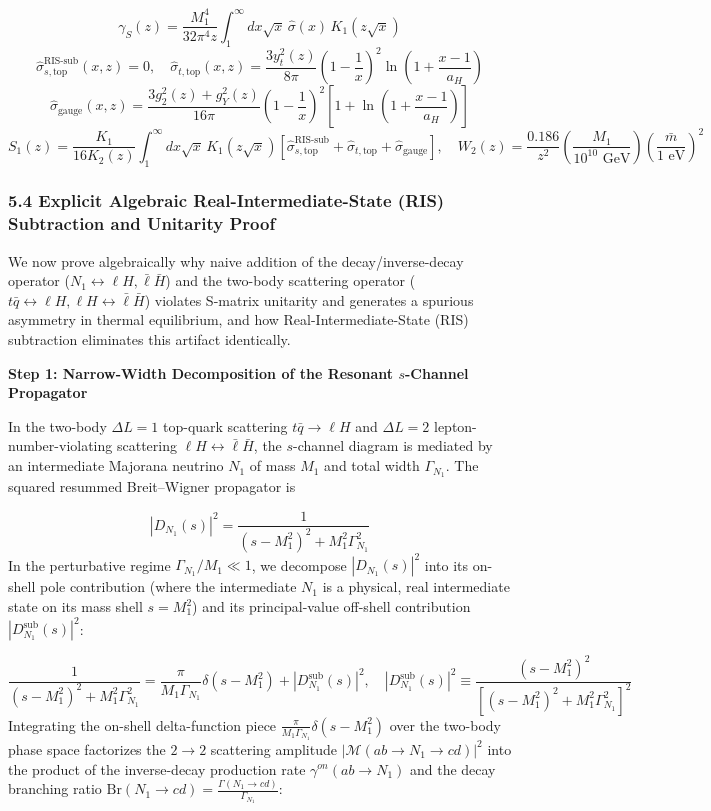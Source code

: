 \documentclass[aps,prd,onecolumn,superscriptaddress,nofootinbib,longbibliography,10pt]{revtex4-2}
\begin{document}
  \[ \gamma_S(z) = \frac{M_1^4}{32\pi^4 z}\int_1^\infty dx\sqrt{x}\,\hat{\sigma}(x)\,K_1\left(z\sqrt{x}\right) \]
  \[ \hat{\sigma}_{s,\text{top}}^{\text{RIS-sub}}(x,z) = 0, \quad \hat{\sigma}_{t,\text{top}}(x,z) = \frac{3y_t^2(z)}{8\pi}\left(1 - \frac{1}{x}\right)^2\ln\left(1 + \frac{x - 1}{a_H}\right) \]
  \[ \hat{\sigma}_{\text{gauge}}(x,z) = \frac{3g_2^2(z) + g_Y^2(z)}{16\pi}\left(1 - \frac{1}{x}\right)^2\left[ 1 + \ln\left(1 + \frac{x - 1}{a_H}\right) \right] \]
  \[ S_1(z) = \frac{K_1}{16K_2(z)}\int_1^\infty dx\sqrt{x}\,K_1(z\sqrt{x})\left[ \hat{\sigma}_{s,\text{top}}^{\text{RIS-sub}} + \hat{\sigma}_{t,\text{top}} + \hat{\sigma}_{\text{gauge}} \right], \quad W_2(z) = \frac{0.186}{z^2}\left(\frac{M_1}{10^{10}\text{ GeV}}\right)\left(\frac{\bar{m}}{1\text{ eV}}\right)^2 \]
  
  
\subsubsection*{5.4 Explicit Algebraic Real-Intermediate-State (RIS) Subtraction and Unitarity Proof}

  We now prove algebraically why naive addition of the decay/inverse-decay operator (\(N_1 \leftrightarrow \ell H, \bar{\ell}\bar{H}\)) and the two-body scattering operator (\(t\bar{q} \leftrightarrow \ell H, \ell H \leftrightarrow \bar{\ell}\bar{H}\)) violates S-matrix unitarity and generates a spurious asymmetry in thermal equilibrium, and how Real-Intermediate-State (RIS) subtraction eliminates this artifact identically.


  \textbf{Step 1: Narrow-Width Decomposition of the Resonant \(s\)-Channel Propagator}


  In the two-body \(\Delta L = 1\) top-quark scattering \(t\bar{q} \to \ell H\) and \(\Delta L = 2\) lepton-number-violating scattering \(\ell H \leftrightarrow \bar{\ell}\bar{H}\), the \(s\)-channel diagram is mediated by an intermediate Majorana neutrino \(N_1\) of mass \(M_1\) and total width \(\Gamma_{N_1}\). The squared resummed Breit–Wigner propagator is


  \[ |D_{N_1}(s)|^2 = \frac{1}{(s - M_1^2)^2 + M_1^2\Gamma_{N_1}^2} \]
  In the perturbative regime \(\Gamma_{N_1}/M_1 \ll 1\), we decompose \(|D_{N_1}(s)|^2\) into its on-shell pole contribution (where the intermediate \(N_1\) is a physical, real intermediate state on its mass shell \(s = M_1^2\)) and its principal-value off-shell contribution \(|D_{N_1}^{\text{sub}}(s)|^2\):


  \[ \frac{1}{(s - M_1^2)^2 + M_1^2\Gamma_{N_1}^2} = \frac{\pi}{M_1\Gamma_{N_1}}\delta(s - M_1^2) + |D_{N_1}^{\text{sub}}(s)|^2, \quad |D_{N_1}^{\text{sub}}(s)|^2 \equiv \frac{(s - M_1^2)^2}{\left[(s - M_1^2)^2 + M_1^2\Gamma_{N_1}^2\right]^2} \]
  Integrating the on-shell delta-function piece \(\frac{\pi}{M_1\Gamma_{N_1}}\delta(s - M_1^2)\) over the two-body phase space factorizes the \(2 \to 2\) scattering amplitude \(|\mathcal{M}(ab \to N_1 \to cd)|^2\) into the product of the inverse-decay production rate \(\gamma^{on}(ab \to N_1)\) and the decay branching ratio \(\text{Br}(N_1 \to cd) = \frac{\Gamma(N_1\to cd)}{\Gamma_{N_1}}\):
\end{document}
